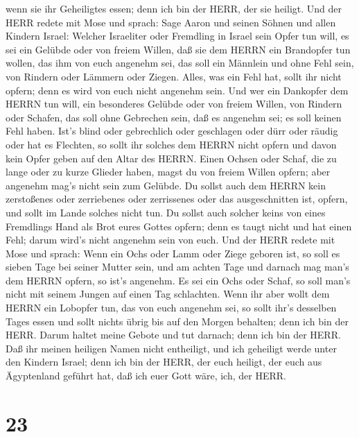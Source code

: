 wenn sie ihr Geheiligtes essen; denn ich bin der HERR, der sie heiligt.
 Und der HERR redete mit Mose und sprach: 
Sage Aaron und seinen Söhnen und allen Kindern Israel: Welcher
Israeliter oder Fremdling in Israel sein Opfer tun will, es sei ein
Gelübde oder von freiem Willen, daß sie dem HERRN ein Brandopfer tun
wollen, das ihm von euch angenehm sei,  das soll ein
Männlein und ohne Fehl sein, von Rindern oder Lämmern oder Ziegen.
 Alles, was ein Fehl hat, sollt ihr nicht opfern; denn es
wird von euch nicht angenehm sein.  Und wer ein Dankopfer
dem HERRN tun will, ein besonderes Gelübde oder von freiem Willen, von
Rindern oder Schafen, das soll ohne Gebrechen sein, daß es angenehm sei;
es soll keinen Fehl haben.  Ist's blind oder gebrechlich
oder geschlagen oder dürr oder räudig oder hat es Flechten, so sollt ihr
solches dem HERRN nicht opfern und davon kein Opfer geben auf den Altar
des HERRN.  Einen Ochsen oder Schaf, die zu lange oder zu
kurze Glieder haben, magst du von freiem Willen opfern; aber angenehm
mag's nicht sein zum Gelübde.  Du sollst auch dem HERRN
kein zerstoßenes oder zerriebenes oder zerrissenes oder das
ausgeschnitten ist, opfern, und sollt im Lande solches nicht tun.
 Du sollst auch solcher keins von eines Fremdlings Hand als
Brot eures Gottes opfern; denn es taugt nicht und hat einen Fehl; darum
wird's nicht angenehm sein von euch.  Und der HERR redete
mit Mose und sprach:  Wenn ein Ochs oder Lamm oder Ziege
geboren ist, so soll es sieben Tage bei seiner Mutter sein, und am
achten Tage und darnach mag man's dem HERRN opfern, so ist's angenehm.
 Es sei ein Ochs oder Schaf, so soll man's nicht mit seinem
Jungen auf einen Tag schlachten.  Wenn ihr aber wollt dem
HERRN ein Lobopfer tun, das von euch angenehm sei,  so
sollt ihr's desselben Tages essen und sollt nichts übrig bis auf den
Morgen behalten; denn ich bin der HERR.  Darum haltet meine
Gebote und tut darnach; denn ich bin der HERR.  Daß ihr
meinen heiligen Namen nicht entheiligt, und ich geheiligt werde unter
den Kindern Israel; denn ich bin der HERR, der euch heiligt,
 der euch aus Ägyptenland geführt hat, daß ich euer Gott
wäre, ich, der HERR.

\hypertarget{section-22}{%
\section{23}\label{section-22}}

